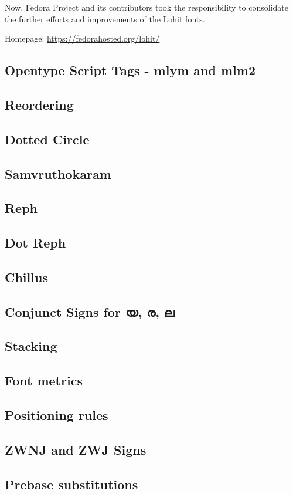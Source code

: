 Now, Fedora Project and its contributors took the responsibility to consolidate
the further efforts and improvements of the Lohit fonts.

Homepage: {\url{https://fedorahosted.org/lohit/}}

\subsection {Opentype Script Tags - mlym and mlm2}
\subsection {Reordering}
\subsection {Dotted Circle}
\subsection {Samvruthokaram}
\subsection {Reph}
\subsection {Dot Reph}
\subsection {Chillus}
\subsection {Conjunct Signs for യ, ര, ല}
\subsection {Stacking}
\subsection {Font metrics}
\subsection {Positioning rules}
\subsection {ZWNJ and ZWJ Signs}
\subsection {Prebase substitutions}
